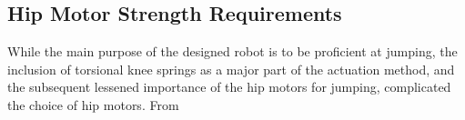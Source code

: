 \subsection{Hip Motor Strength Requirements}

While the main purpose of the designed robot is to be proficient at jumping, the inclusion of torsional knee springs as a major part of the actuation method, and the subsequent lessened importance of the hip motors for jumping, complicated the choice of hip motors. From \cite{finn_tarek_master}
